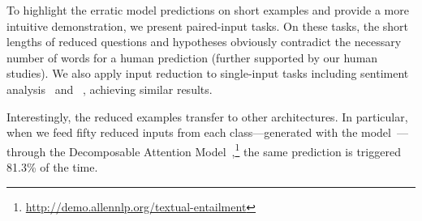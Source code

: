 To highlight the erratic model predictions on short examples and
provide a more intuitive demonstration, we present paired-input tasks. On
these tasks, the short lengths of reduced questions and hypotheses obviously
contradict the necessary number of words for a human prediction (further
supported by our human studies).
We also apply input reduction to single-input tasks including
sentiment analysis~\cite{mass2011imdb} and
\qb{}~\cite{boydgraber2012besting}, achieving similar results.

Interestingly, the reduced examples transfer to other architectures.
In particular, when we feed fifty reduced \snli{} inputs from each
class---generated with the 
model~\cite{wang2017bilateral}---through the Decomposable Attention
Model~\cite{parikh2016decomposable},\footnote{\url{http://demo.allennlp.org/textual-entailment}}
the same prediction is triggered 81.3\% of the time.
